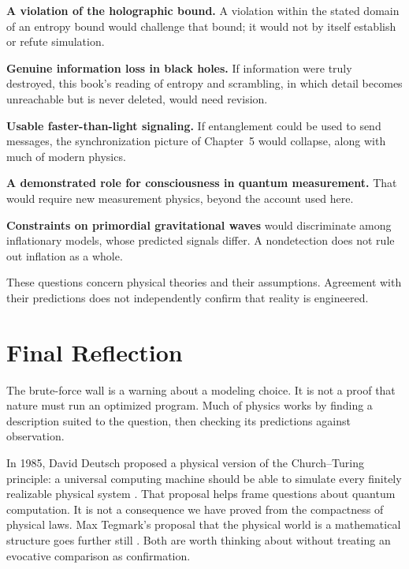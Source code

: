 \begin{compactchecklist}
\item \textbf{A violation of the holographic bound.} A violation within the stated domain of an entropy bound would challenge that bound; it would not by itself establish or refute simulation.
\item \textbf{Genuine information loss in black holes.} If information were truly destroyed, this book's reading of entropy and scrambling, in which detail becomes unreachable but is never deleted, would need revision.
\item \textbf{Usable faster-than-light signaling.} If entanglement could be used to send messages, the synchronization picture of Chapter~5 would collapse, along with much of modern physics.
\item \textbf{A demonstrated role for consciousness in quantum measurement.} That would require new measurement physics, beyond the account used here.
\item \textbf{Constraints on primordial gravitational waves} would discriminate among inflationary models, whose predicted signals differ. A nondetection does not rule out inflation as a whole.
\end{compactchecklist}

These questions concern physical theories and their assumptions. Agreement with their predictions does not independently confirm that reality is engineered.

\section{Final Reflection}

The brute-force wall is a warning about a modeling choice. It is not a proof that nature must run an optimized program. Much of physics works by finding a description suited to the question, then checking its predictions against observation.

In 1985, David Deutsch proposed a physical version of the Church--Turing principle: a universal computing machine should be able to simulate every finitely realizable physical system \cite{deutsch1985}. That proposal helps frame questions about quantum computation. It is not a consequence we have proved from the compactness of physical laws. Max Tegmark's proposal that the physical world is a mathematical structure goes further still \cite{tegmark2008}. Both are worth thinking about without treating an evocative comparison as confirmation.

